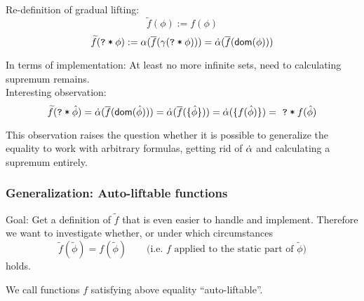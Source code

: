 \documentclass[11pt,a4paper]{article}
\newcommand{\grad}[1]{\widetilde{#1}}
\newcommand{\ttt}{\texttt}
\newcommand{\predicate}{\textsf}
\newcommand{\qm}{\ttt{?}}
\newcommand{\withqm}[1]{\ttt{\qm\:*\:$#1$}}
\newcommand{\dom}{\predicate{dom}}
\begin{document}
~\\
Re-definition of gradual lifting:
$$\grad{f}(\phi) := f(\phi)$$ 
$$\grad{f}(\withqm{\phi}) := \alpha(\overline{f}(\gamma(\withqm{\phi}))) = \dalpha(\overline{f}(\dom(\phi)))$$ 

In terms of implementation: At least no more infinite sets, need to calculating supremum remains.\\

Interesting observation:
$$\grad{f}(\withqm{\hat{\phi}}) = \dalpha(\overline{f}(\dom(\hat{\phi}))) = \dalpha(\overline{f}(\{ \hat{\phi} \})) = \dalpha(\{ f(\hat{\phi}) \}) = \,\,\withqm{f(\hat{\phi})}$$

This observation raises the question whether it is possible to generalize the equality to work with arbitrary formulas, getting rid of $\dot{\alpha}$ and calculating a supremum entirely.




\subsubsection{Generalization: Auto-liftable functions}
Goal:
Get a definition of $\grad{f}$ that is even easier to handle and implement.
Therefore we want to investigate whether, or under which circumstances 
$$\grad{f}(\grad{\phi}) = f(\grad{\phi}) \quad\quad\text{(i.e. $f$ applied to the static part of $\grad{\phi}$)}$$
holds.

We call functions $f$ satisfying above equality “auto-liftable”.

\end{document}
